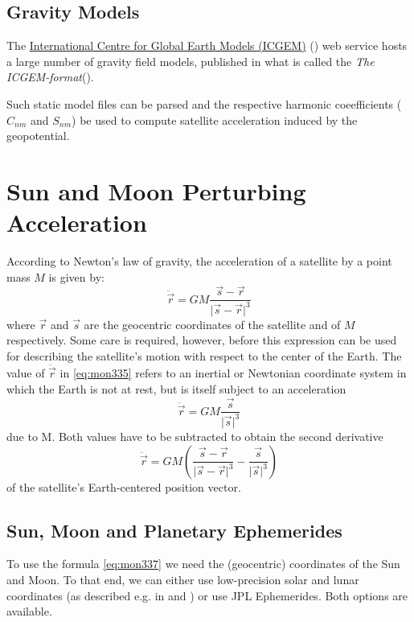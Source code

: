 \subsection{Gravity Models}
The \href{http://icgem.gfz-potsdam.de/home}{International Centre for Global Earth Models (ICGEM)}  
(\cite{icgempub}) web service hosts a large number of gravity field models, 
published in what is called the \emph{The ICGEM-format}(\cite{ICGEMFormat}). 

Such static model files can be parsed and the respective harmonic coeefficients 
(\(C_{nm}\) and \(S_{nm}\)) be used to compute satellite acceleration induced by 
the geopotential.

\section{Sun and Moon Perturbing Acceleration}
According to Newton's law of gravity, the acceleration of a satellite by a point 
mass \(M\) is given by:
\begin{equation}
    \label{eq:mon335}
    \ddot{\vec{r}} = G M \frac{\vec{s}-\vec{r}}{\lvert \vec{s} - \vec{r} \rvert ^3}
\end{equation}
where \(\vec{r}\) and \(\vec{s}\) are the geocentric coordinates of the satellite 
and of \(M\) respectively. Some care is required, however, before this expression 
can be used for describing the satellite's motion with respect to the center of 
the Earth. The value of \(\ddot{\vec{r}}\) in \ref{eq:mon335} refers to an 
inertial or Newtonian coordinate system in which the Earth is not at rest, but 
is itself subject to an acceleration
\begin{equation}
    \ddot{\vec{r}} = G M \frac{\vec{s}}{\lvert \vec{s} \rvert ^3}
\end{equation}
due to M. Both values have to be subtracted to obtain the second derivative
\begin{equation}
    \label{eq:mon337}
    \ddot{\vec{r}} = G M (\frac{\vec{s}-\vec{r}}{\lvert \vec{s} - \vec{r} \rvert ^3} - \frac{\vec{s}}{\lvert \vec{s} \rvert ^3})
\end{equation}
of the satellite's Earth-centered position vector.

\subsection{Sun, Moon and Planetary Ephemerides}
To use the formula \ref{eq:mon337} we need the (geocentric) coordinates of the 
Sun and Moon. To that end, we can either use low-precision solar and lunar 
coordinates (as described e.g. in \cite{Montenbruck2000} and \cite{Vallado}) or 
use JPL Ephemerides. Both options are available.


